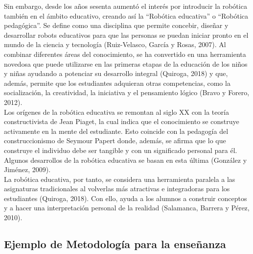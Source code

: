\documentclass{report}
\begin{document}
Sin embargo, desde los años sesenta aumentó el interés por introducir la robótica también en el ámbito educativo, creando así la “Robótica educativa” o “Robótica pedagógica”. Se define como una disciplina que permite concebir, diseñar y desarrollar robots educativos para que las personas se puedan iniciar pronto en el mundo de la ciencia y tecnología (Ruiz-Velasco, García y Rosas, 2007). Al combinar diferentes áreas del conocimiento, se ha convertido en una herramienta novedosa que puede utilizarse en las primeras etapas de la educación de los niños y niñas ayudando a potenciar su desarrollo integral (Quiroga, 2018) y que, además, permite que los estudiantes adquieran otras competencias, como la socialización, la creatividad,  la iniciativa y el pensamiento lógico (Bravo y Forero, 2012).
\\

Los orígenes de la robótica educativa se remontan al siglo XX con la teoría constructivista de Jean Piaget, la cual indica que el conocimiento se construye activamente en la mente del estudiante. Esto coincide con la pedagogía del construccionismo de Seymour Papert donde, además, se afirma que lo que construye el individuo debe ser tangible y con un significado personal para él. Algunos desarrollos de la robótica educativa se basan en esta última (González y Jiménez, 2009).
\\

La robótica educativa, por tanto, se considera una herramienta paralela a las asignaturas tradicionales al volverlas más atractivas e integradoras para los estudiantes (Quiroga, 2018). Con ello, ayuda a los alumnos a construir conceptos y a hacer una interpretación personal de la realidad (Salamanca, Barrera y Pérez, 2010).
\\

\subsection{Ejemplo de Metodología para la enseñanza}
\end{document}
